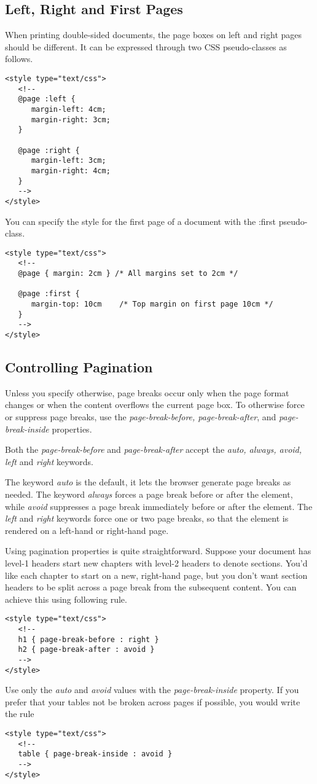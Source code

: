 \documentclass[a4paper,oneside]{book}
\numberwithin{equation}{chapter}
\begin{document}
\subsection{Left, Right and First Pages}
When printing double-sided documents, the page boxes on left and right pages should be different. It can be expressed through two CSS pseudo-classes as follows.
\begin{verbatim}
<style type="text/css">
   <!--
   @page :left {
      margin-left: 4cm;
      margin-right: 3cm;
   }

   @page :right {
      margin-left: 3cm;
      margin-right: 4cm;
   }
   -->
</style>
\end{verbatim}
You can specify the style for the first page of a document with the :first pseudo-class.
\begin{verbatim}
<style type="text/css">
   <!--
   @page { margin: 2cm } /* All margins set to 2cm */

   @page :first {
      margin-top: 10cm    /* Top margin on first page 10cm */
   }
   -->
</style>
\end{verbatim}
\subsection{Controlling Pagination}
Unless you specify otherwise, page breaks occur only when the page format changes or when the content overflows the current page box. To otherwise force or suppress page breaks, use the \textit{page-break-before, page-break-after}, and \textit{page-break-inside} properties.

Both the \textit{page-break-before} and \textit{page-break-after} accept the \textit{auto, always, avoid, left} and \textit{right} keywords.

The keyword \textit{auto} is the default, it lets the browser generate page breaks as needed. The keyword \textit{always} forces a page break before or after the element, while \textit{avoid} suppresses a page break immediately before or after the element. The \textit{left} and \textit{right} keywords force one or two page breaks, so that the element is rendered on a left-hand or right-hand page.

Using pagination properties is quite straightforward. Suppose your document has level-1 headers start new chapters with level-2 headers to denote sections. You'd like each chapter to start on a new, right-hand page, but you don't want section headers to be split across a page break from the subsequent content. You can achieve this using following rule.
\begin{verbatim}
<style type="text/css">
   <!--
   h1 { page-break-before : right }
   h2 { page-break-after : avoid }
   -->
</style>
\end{verbatim}
Use only the \textit{auto} and \textit{avoid} values with the\textit{ page-break-inside} property. If you prefer that your tables not be broken across pages if possible, you would write the rule
\begin{verbatim}
<style type="text/css">
   <!--
   table { page-break-inside : avoid }
   -->
</style>
\end{verbatim}
\end{document}
